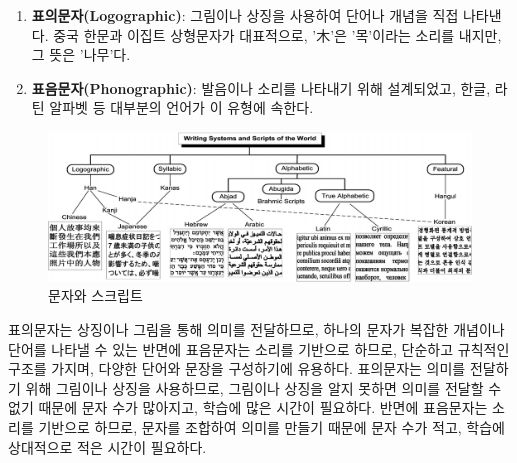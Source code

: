 \documentclass[
  letterpaper,
]{book}
\begin{document}
\begin{enumerate}
\def\labelenumi{\arabic{enumi}.}
\item
  \textbf{표의문자(Logographic)}: 그림이나 상징을 사용하여 단어나 개념을
  직접 나타낸다. 중국 한문과 이집트 상형문자가 대표적으로, '木'은
  '목'이라는 소리를 내지만, 그 뜻은 '나무'다.
\item
  \textbf{표음문자(Phonographic)}: 발음이나 소리를 나타내기 위해
  설계되었고, 한글, 라틴 알파벳 등 대부분의 언어가 이 유형에 속한다.
\end{enumerate}

\begin{figure}

{\centering \includegraphics{images/writing-systems.png}

}

\caption{문자와 스크립트}

\end{figure}

표의문자는 상징이나 그림을 통해 의미를 전달하므로, 하나의 문자가 복잡한
개념이나 단어를 나타낼 수 있는 반면에 표음문자는 소리를 기반으로 하므로,
단순하고 규칙적인 구조를 가지며, 다양한 단어와 문장을 구성하기에
유용하다. 표의문자는 의미를 전달하기 위해 그림이나 상징을 사용하므로,
그림이나 상징을 알지 못하면 의미를 전달할 수 없기 때문에 문자 수가
많아지고, 학습에 많은 시간이 필요하다. 반면에 표음문자는 소리를 기반으로
하므로, 문자를 조합하여 의미를 만들기 때문에 문자 수가 적고, 학습에
상대적으로 적은 시간이 필요하다.
\end{document}
